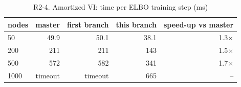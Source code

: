 \begin{table}[H]\centering\small
\caption{R2-4. Amortized VI: time per ELBO training step (ms)}\label{tab:r2avi}

\begin{tabular}{lrrrr}\toprule
nodes & master & first branch & this branch & speed-up vs master \\ \midrule
50 & 49.9 & 50.1 & 38.1 & 1.3$\times$ \\
200 & 211 & 211 & 143 & 1.5$\times$ \\
500 & 572 & 582 & 341 & 1.7$\times$ \\
1000 & timeout & timeout & 665 & -- \\
\bottomrule\end{tabular}
\end{table}
